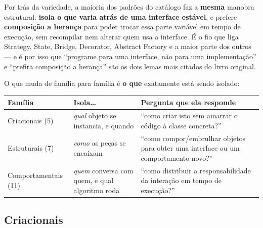 \begin{conceito}
Por trás da variedade, a maioria dos padrões do catálogo faz a
\textbf{mesma} manobra estrutural: \textbf{isola o que varia atrás de uma
interface estável}, e prefere \textbf{composição a herança} para poder
trocar essa parte variável em tempo de execução, sem recompilar nem alterar
quem usa a interface. É o fio que liga Strategy, State, Bridge, Decorator,
Abstract Factory e a maior parte dos outros --- e é por isso que “programe
para uma interface, não para uma implementação” e “prefira composição a
herança” são os dois lemas mais citados do livro original.

O que muda de família para família é \textbf{o que} exatamente está sendo
isolado:

\begin{center}
\begin{tabular}{@{}p{3.2cm}p{3.8cm}p{4.8cm}@{}}
\toprule
\textbf{Família} & \textbf{Isola\ldots} & \textbf{Pergunta que ela responde} \\
\midrule
Criacionais (5) & \textit{qual} objeto se instancia, e quando & “como criar
isto sem amarrar o código à classe concreta?” \\
Estruturais (7) & \textit{como} as peças se encaixam & “como
compor/embrulhar objetos para obter uma interface ou um comportamento
novo?” \\
Comportamentais (11) & \textit{quem} conversa com quem, e qual algoritmo
roda & “como distribuir a responsabilidade da interação em tempo de
execução?” \\
\bottomrule
\end{tabular}
\end{center}
\end{conceito}

\subsection{Criacionais}

